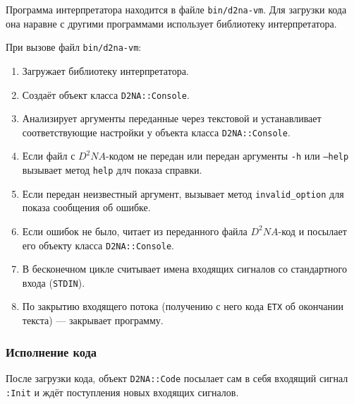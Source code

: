 \documentclass[utf8,a5paper,portrait,10pt]{eskdtext}
\begin{document}
Программа интерпретатора находится в файле \texttt{bin/d2na-vm}. Для загрузки
кода она наравне с другими программами использует библиотеку интерпретатора.

При вызове файл \texttt{bin/d2na-vm}:
\begin{enumerate}
  \item Загружает библиотеку интерпретатора.
  \item Создаёт объект класса \texttt{D2NA::Console}.
  \item Анализирует аргументы переданные через текстовой и устанавливает
        соответствующие настройки у объекта класса \texttt{D2NA::Console}.
  \item Если файл с $D^2NA$-кодом не передан или передан аргументы \texttt{-h}
        или \texttt{--help} вызывает метод \texttt{help} длч показа справки.
  \item Если передан неизвестный аргумент, вызывает метод
        \texttt{invalid\_option} для показа сообщения об ошибке.
  \item Если ошибок не было, читает из переданного файла $D^2NA$-код и посылает
        его объекту класса \texttt{D2NA::Console}.
  \item В бесконечном цикле считывает имена входящих сигналов со стандартного
        входа (\texttt{STDIN}).
  \item По закрытию входящего потока (получению с него кода \texttt{ETX} об
        окончании текста) — закрывает программу.
\end{enumerate}

\newpage
\subsubsection{Исполнение кода}

После загрузки кода, объект \texttt{D2NA::Code} посылает сам в себя входящий
сигнал \texttt{:Init} и ждёт поступления новых входящих сигналов.
\end{document}
